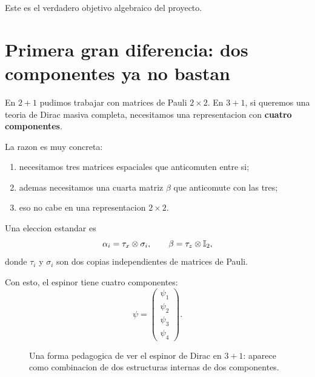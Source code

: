 Este es el verdadero objetivo algebraico del proyecto.

\section{Primera gran diferencia: dos componentes ya no bastan}

En \(2+1\) pudimos trabajar con matrices de Pauli \(2\times 2\). En \(3+1\), si queremos una teoria de Dirac masiva completa, necesitamos una representacion con \textbf{cuatro componentes}.

La razon es muy concreta:

\begin{enumerate}[leftmargin=*]
  \item necesitamos tres matrices espaciales que anticomuten entre si;
  \item ademas necesitamos una cuarta matriz \(\beta\) que anticomute con las tres;
  \item eso no cabe en una representacion \(2\times 2\).
\end{enumerate}

Una eleccion estandar es
\begin{equation}
\alpha_i = \tau_x \otimes \sigma_i,
\qquad
\beta = \tau_z \otimes \mathbb{I}_2,
\label{c17:eq:dirac-rep}
\end{equation}
donde \(\tau_i\) y \(\sigma_i\) son dos copias independientes de matrices de Pauli.

Con esto, el espinor tiene cuatro componentes:
\begin{equation}
\psi=
\begin{pmatrix}
\psi_1\\
\psi_2\\
\psi_3\\
\psi_4
\end{pmatrix}.
\end{equation}

\begin{figure}[ht]
\centering
{}
\caption{Una forma pedagogica de ver el espinor de Dirac en \(3+1\): aparece como combinacion de dos estructuras internas de dos componentes.}
\label{c17:fig:four-components}
\end{figure}

